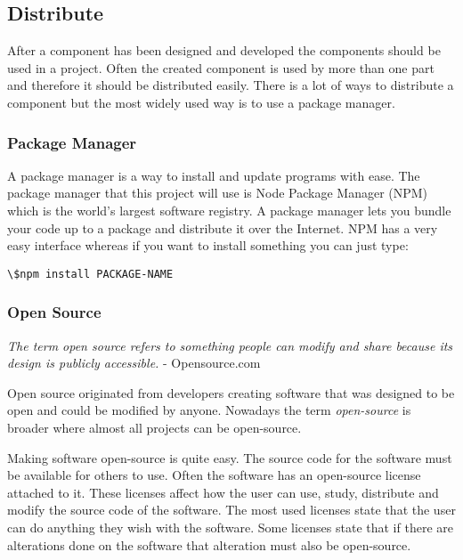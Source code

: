 \subsection{Distribute}%
\label{sub:Distribute}
After a component has been designed and developed the components should be used in a project. Often the created component is used by more than one part and therefore it should be distributed easily. There is a lot of ways to distribute a component but the most widely used way is to use a package manager.


\subsubsection{Package Manager}%
\label{sub:Package Manager}
\cite{PackageManager2020} 

A package manager is a way to install and update programs with ease. The package manager that this project will use is Node Package Manager (NPM) which is the world's largest software registry\cite{NpmNpmDocs}. A package manager lets you bundle your code up to a package and distribute it over the Internet. NPM has a very easy interface whereas if you want to install something you can just type: 

\begin{lstlisting}[style=htmlcssjs]
\$npm install PACKAGE-NAME
\end{lstlisting}

\subsubsection{Open Source}%
\label{ssub:Open Source}

\textit{The term open source refers to something people can modify and share because its design is publicly accessible.} - Opensource.com 

Open source originated from developers creating software that was designed to be open and could be modified by anyone. Nowadays the term \textit{open-source} is broader where almost all projects can be open-source. 

Making software open-source is quite easy. The source code for the software must be available for others to use. Often the software has an open-source license attached to it. These licenses affect how the user can use, study, distribute and modify the source code of the software. The most used licenses state that the user can do anything they wish with the software. Some licenses state that if there are alterations done on the software that alteration must also be open-source.

